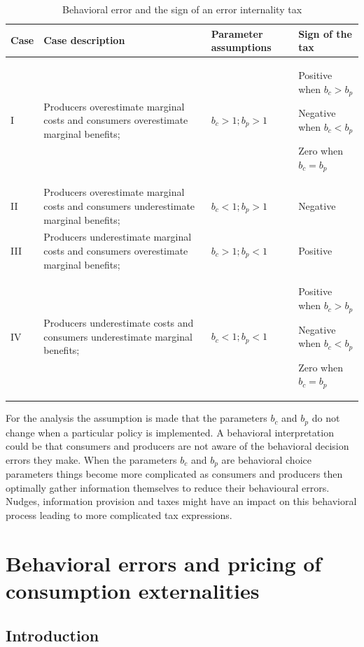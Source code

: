 \documentclass[
]{book}
\begin{document}
\begin{table}

\caption{\label{tab:beherror}Behavioral error and the sign of an error internality tax}
\centering
\begin{tabular}[t]{llll}
\toprule
Case & Case description & Parameter assumptions & Sign of the tax\\
\midrule
I & Producers overestimate marginal costs and consumers overestimate marginal benefits; & $b_c>1; b_p>1$ & Positive when $b_c>b_p$
 
Negative when  $b_c<b_p$

Zero when $b_c=b_p$\\
II & Producers overestimate marginal costs and consumers underestimate marginal benefits; & $b_c<1; b_p>1$ & Negative\\
III & Producers underestimate marginal costs and consumers overestimate marginal benefits; & $b_c>1; b_p<1$ & Positive\\
IV & Producers underestimate costs and consumers underestimate marginal benefits; & $b_c<1; b_p<1$ & Positive when $b_c>b_p$
 
Negative when  $b_c<b_p$

Zero when $b_c=b_p$\\
\bottomrule
\end{tabular}
\end{table}

For the analysis the assumption is made that the parameters \(b_c\) and \(b_p\) do not change when a particular policy is implemented. A behavioral interpretation could be that consumers and producers are not aware of the behavioral decision errors they make. When the parameters \(b_c\) and \(b_p\) are behavioral choice parameters things become more complicated as consumers and producers then optimally gather information themselves to reduce their behavioural errors. Nudges, information provision and taxes might have an impact on this behavioral process leading to more complicated tax expressions.

\hypertarget{behavioral-errors-and-pricing-of-consumption-externalities}{%
\section{Behavioral errors and pricing of consumption externalities}\label{behavioral-errors-and-pricing-of-consumption-externalities}}

\hypertarget{introduction-9}{%
\subsection{Introduction}\label{introduction-9}}
\end{document}
